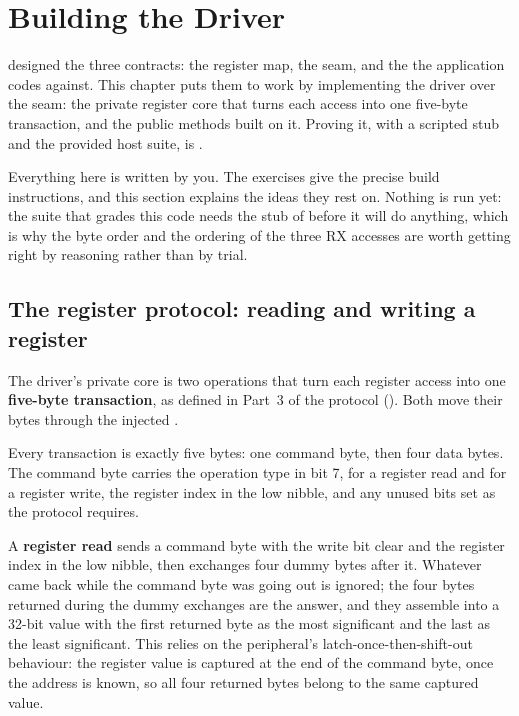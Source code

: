 
\section{Building the Driver}
\label{c7:sec:driver}\label{c7:app:a}
 designed the three contracts: the register map, the 
seam, and the  the application codes against. This chapter puts them to work by
implementing the  driver over the seam: the private register core that turns each access
into one five-byte transaction, and the public methods built on it. Proving it, with a scripted stub
and the provided host suite, is .

Everything here is written by you. The exercises give the precise build instructions, and this
section explains the ideas they rest on. Nothing is run yet: the suite that grades this code needs
the stub of  before it will do anything, which is why the byte order and the ordering of
the three RX accesses are worth getting right by reasoning rather than by trial.

\subsection{The register protocol: reading and writing a register}
\label{c7:sec:register_protocol}
The driver's private core is two operations that turn each register access into one
\textbf{five-byte transaction}, as defined in Part~3 of the protocol (). Both
move their bytes through the injected .

Every transaction is exactly five bytes: one command byte, then four data bytes. The command byte
carries the operation type in bit 7,  for a register read and  for a register write,
the register index in the low nibble, and any unused bits set as the protocol requires.

A \textbf{register read} sends a command byte with the write bit clear and the register index in the
low nibble, then exchanges four dummy bytes after it. Whatever came back while the command byte was
going out is ignored; the four bytes returned during the dummy exchanges are the answer, and they
assemble into a 32-bit value with the first returned byte as the most significant and the last as
the least significant. This relies on the peripheral's latch-once-then-shift-out behaviour: the
register value is captured at the end of the command byte, once the address is known, so all four
returned bytes belong to the same captured value.

